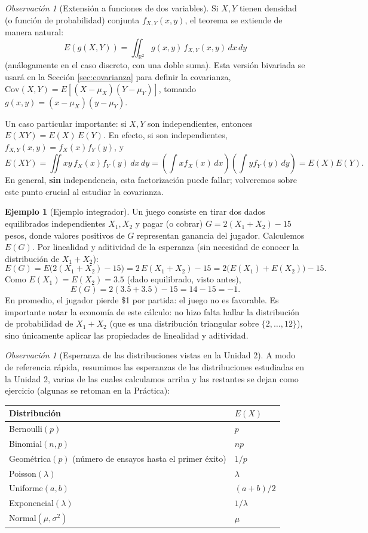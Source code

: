 \documentclass[11pt,a4paper]{article}
\theoremstyle{plain}
\theoremstyle{definition}
\newtheorem{ejemplo}[teorema]{Ejemplo}
\theoremstyle{remark}
\newtheorem{observacion}[teorema]{Observación}
\begin{document}
\begin{observacion}[Extensión a funciones de dos variables]
Si $X,Y$ tienen densidad (o función de probabilidad) conjunta $f_{X,Y}(x,y)$, el teorema se extiende de manera natural:
\[
E(g(X,Y)) = \iint_{\mathbb{R}^2} g(x,y)\,f_{X,Y}(x,y)\,dx\,dy
\]
(análogamente en el caso discreto, con una doble suma). Esta versión bivariada se usará en la Sección \ref{sec:covarianza} para definir la covarianza, $\text{Cov}(X,Y)=E[(X-\mu_X)(Y-\mu_Y)]$, tomando $g(x,y)=(x-\mu_X)(y-\mu_Y)$.

Un caso particular importante: si $X,Y$ son independientes, entonces $E(XY)=E(X)\,E(Y)$. En efecto, si son independientes, $f_{X,Y}(x,y)=f_X(x)f_Y(y)$, y
\[
E(XY) = \iint xy\, f_X(x)f_Y(y)\,dx\,dy = \left(\int x f_X(x)\,dx\right)\left(\int y f_Y(y)\,dy\right) = E(X)E(Y).
\]
En general, \textbf{sin} independencia, esta factorización puede fallar; volveremos sobre este punto crucial al estudiar la covarianza.
\end{observacion}

\begin{ejemplo}[Ejemplo integrador]
Un juego consiste en tirar dos dados equilibrados independientes $X_1,X_2$ y pagar (o cobrar) $G=2(X_1+X_2)-15$ pesos, donde valores positivos de $G$ representan ganancia del jugador. Calculemos $E(G)$. Por linealidad y aditividad de la esperanza (sin necesidad de conocer la distribución de $X_1+X_2$):
\[
E(G) = E\big(2(X_1+X_2)-15\big) = 2\,E(X_1+X_2) - 15 = 2\big(E(X_1)+E(X_2)\big)-15.
\]
Como $E(X_1)=E(X_2)=3.5$ (dado equilibrado, visto antes),
\[
E(G) = 2(3.5+3.5)-15 = 14-15 = -1.
\]
En promedio, el jugador pierde \$1 por partida: el juego no es favorable. Es importante notar la economía de este cálculo: no hizo falta hallar la distribución de probabilidad de $X_1+X_2$ (que es una distribución triangular sobre $\{2,\dots,12\}$), sino únicamente aplicar las propiedades de linealidad y aditividad.
\end{ejemplo}

\begin{observacion}[Esperanza de las distribuciones vistas en la Unidad 2]
A modo de referencia rápida, resumimos las esperanzas de las distribuciones estudiadas en la Unidad 2, varias de las cuales calculamos arriba y las restantes se dejan como ejercicio (algunas se retoman en la Práctica):
\begin{center}
\begin{tabular}{@{}ll@{}}
\toprule
Distribución & $E(X)$ \\
\midrule
Bernoulli$(p)$ & $p$ \\
Binomial$(n,p)$ & $np$ \\
Geométrica$(p)$ (número de ensayos hasta el primer éxito) & $1/p$ \\
Poisson$(\lambda)$ & $\lambda$ \\
Uniforme$(a,b)$ & $(a+b)/2$ \\
Exponencial$(\lambda)$ & $1/\lambda$ \\
Normal$(\mu,\sigma^2)$ & $\mu$ \\
\bottomrule
\end{tabular}
\end{center}
\end{observacion}
\end{document}

